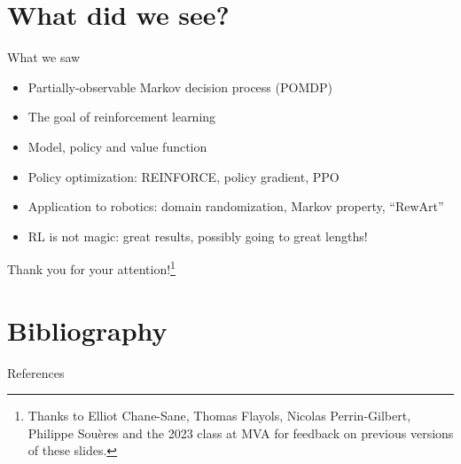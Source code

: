 \documentclass[10pt, aspectratio=1610]{beamer}
\begin{document}
\section{What did we see?}

\begin{frame}{What we saw}
    \begin{itemize}
        \item Partially-observable Markov decision process (POMDP)
        \item The goal of reinforcement learning
        \item Model, policy and value function
        \item Policy optimization: REINFORCE, policy gradient, PPO
        \item Application to robotics: domain randomization, Markov property, ``RewArt''
        \item RL is not magic: great results, possibly going to great lengths!
    \end{itemize}
\end{frame}

\begin{frame}[standout]
    Thank you for your attention!\footnote{\color{white} Thanks to Elliot Chane-Sane, Thomas Flayols, Nicolas Perrin-Gilbert, Philippe Sou\`{e}res and the 2023 class at MVA for feedback on previous versions of these slides.}
\end{frame}

\section*{Bibliography}

\renewcommand*{\bibfont}{\footnotesize}
\begin{frame}[allowframebreaks]{References}
    \printbibliography[heading=none]
\end{frame}
\end{document}
